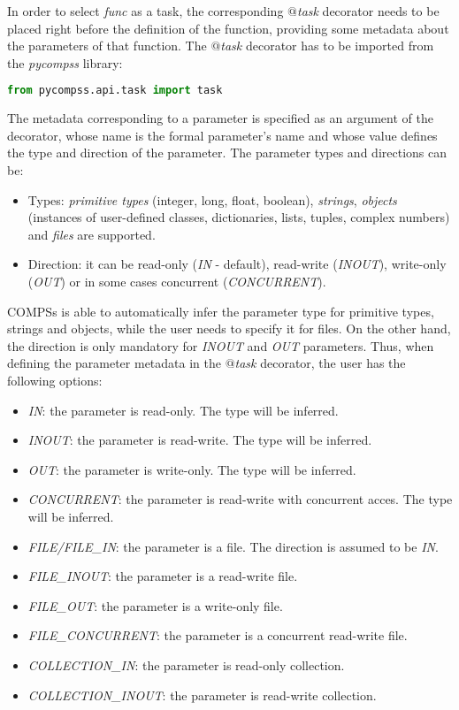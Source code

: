 In order to select {\it func} as a task, the corresponding {\it $@$task} decorator needs to be placed right 
before the definition of the function, providing some metadata about the parameters of that function. 
The {\it $@$task} decorator has to be imported from the {\it pycompss} library:

\begin{lstlisting}[language=python]
from pycompss.api.task import task
\end{lstlisting}

The metadata corresponding to a parameter is specified as an argument of the decorator, whose name is 
the formal parameter's name and whose value defines the type and direction of the parameter. 
The parameter types and directions can be:

\begin{itemize}
 \item Types: {\it primitive types} (integer, long, float, boolean), {\it strings}, {\it objects} (instances of user-defined classes, dictionaries, lists, tuples, complex numbers) and {\it files} are supported.
 \item Direction: it can be read-only ({\it IN} - default), read-write ({\it INOUT}), write-only ({\it OUT}) or in some cases concurrent ({\it CONCURRENT}).
\end{itemize}

COMPSs is able to automatically infer the parameter type for primitive types, strings and objects, 
while the user needs to specify it for files. On the other hand, the direction is only mandatory for 
{\it INOUT} and {\it OUT} parameters. Thus, when defining the parameter metadata in the {\it $@$task} 
decorator, the user has the following options:

\begin{itemize}
 \item {\it IN}: the parameter is read-only. The type will be inferred.
 \item {\it INOUT}: the parameter is read-write. The type will be inferred.
 \item {\it OUT}: the parameter is write-only. The type will be inferred.
 \item {\it CONCURRENT}: the parameter is read-write with concurrent acces. The type will be inferred.
 \item {\it FILE/FILE\_IN}: the parameter is a file. The direction is assumed to be {\it IN}.
 \item {\it FILE\_INOUT}: the parameter is a read-write file.
 \item {\it FILE\_OUT}: the parameter is a write-only file.
 \item {\it FILE\_CONCURRENT}: the parameter is a concurrent read-write file.
 \item {\it COLLECTION\_IN}: the parameter is read-only collection.
 \item {\it COLLECTION\_INOUT}: the parameter is read-write collection.
\end{itemize}

